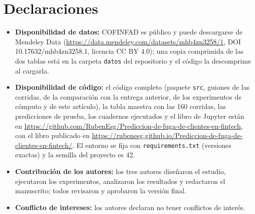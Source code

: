 \documentclass[pdflatex,sn-mathphys-num]{sn-jnl}
\begin{document}
\section*{Declaraciones}

\begin{itemize}
\item \textbf{Disponibilidad de datos:} COFINFAD es público y puede descargarse de Mendeley Data (\url{https://data.mendeley.com/datasets/mhb4zn3258/1}, DOI 10.17632/mhb4zn3258.1, licencia CC BY 4.0); una copia comprimida de las dos tablas está en la carpeta \texttt{datos} del repositorio y el código la descomprime al cargarla.
\item \textbf{Disponibilidad de código:} el código completo (paquete \texttt{src}, guiones de las corridas, de la comparación con la entrega anterior, de los experimentos de cómputo y de este artículo), la tabla maestra con las 160 corridas, las predicciones de prueba, los cuadernos ejecutados y el libro de Jupyter están en \url{https://github.com/RubenEsg/Prediccion-de-fuga-de-clientes-en-fintech}, con el libro publicado en \url{https://rubenesg.github.io/Prediccion-de-fuga-de-clientes-en-fintech/}. El entorno se fija con \texttt{requirements.txt} (versiones exactas) y la semilla del proyecto es 42.
\item \textbf{Contribución de los autores:} los tres autores diseñaron el estudio, ejecutaron los experimentos, analizaron los resultados y redactaron el manuscrito; todos revisaron y aprobaron la versión final.
\item \textbf{Conflicto de intereses:} los autores declaran no tener conflictos de interés.
\end{itemize}


\end{document}

